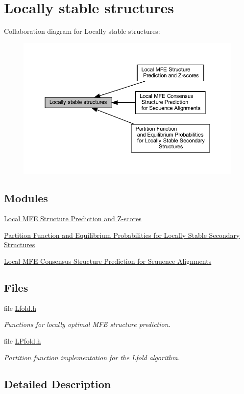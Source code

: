 \hypertarget{group__local__fold}{}\section{Locally stable structures}
\label{group__local__fold}
Collaboration diagram for Locally stable structures\+:
\nopagebreak
\begin{figure}[H]
\begin{center}
\leavevmode
\includegraphics[width=350pt]{group__local__fold}
\end{center}
\end{figure}
\subsection*{Modules}
\begin{DoxyCompactItemize}
\item 
\hyperlink{group__local__mfe__fold}{Local M\+F\+E Structure Prediction and Z-\/scores}
\item 
\hyperlink{group__local__pf__fold}{Partition Function and Equilibrium Probabilities for Locally Stable Secondary Structures}
\item 
\hyperlink{group__local__consensus__fold}{Local M\+F\+E Consensus Structure Prediction for Sequence Alignments}
\end{DoxyCompactItemize}
\subsection*{Files}
\begin{DoxyCompactItemize}
\item 
file \hyperlink{Lfold_8h}{Lfold.\+h}
\begin{DoxyCompactList}\small\item\em Functions for locally optimal M\+FE structure prediction. \end{DoxyCompactList}\item 
file \hyperlink{LPfold_8h}{L\+Pfold.\+h}
\begin{DoxyCompactList}\small\item\em Partition function implementation for the Lfold algorithm. \end{DoxyCompactList}\end{DoxyCompactItemize}


\subsection{Detailed Description}
